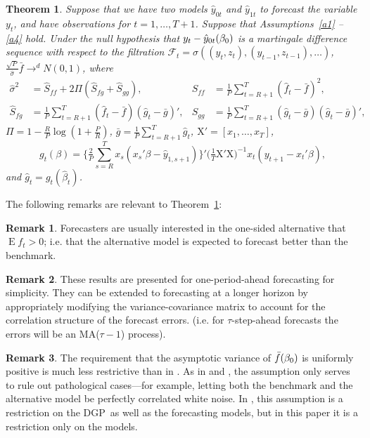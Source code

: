 \documentclass[12pt,fleqn]{article}
\newtheorem{thm}{Theorem}
\theoremstyle{definition}
\newtheorem{rem}{Remark}
\DeclareMathOperator{\E}{E}
\newcommand{\btrue}[1][]{\if#1*\hat\beta_{T+1}\else\beta_0\fi}
\newcommand{\X}{\ensuremath{\mathrm{X}}}
\newcommand{\osum}[1]{\sum_{#1=R+1}^T}
\newcommand{\oavg}[1]{\tfrac{1}{P} \osum{#1}}
\newcommand{\dgp}{DGP}
\newcommand{\ma}{MA}
\begin{document}
\begin{thm}\label{res:1}
  Suppose that we have two models $\hat{y}_{0t}$ and $\hat{y}_{1t}$ to
  forecast the variable $y_t$, and have observations for
  $t=1,\dots,T+1$. Suppose that Assumptions~\ref{a1} -- \ref{a4} hold.
  Under the null hypothesis that $y_t - \hat{y}_{0t}(\btrue)$ is a
  martingale difference sequence with respect to the filtration
  $\mathcal{F}_t = \sigma((y_t, z_{t}), (y_{t-1}, z_{t-1}),\dots)$,
  $\tfrac{\sqrt{P}}{\hat\sigma} \bar f \to^d N(0,1)$, where 
  \begin{align*}
    \hat{\sigma}^2 &= \hat{S}_{ff} + 2 \Pi (\hat{S}_{fg} + \hat{S}_{gg}), &
    \hat{S}_{ff} &= \oavg{t} (\hat f_t - \bar f)^2, \\
    \hat{S}_{fg} &= \oavg{t} (\hat f_t - \bar{f})(\hat g_t - \bar g)', &
    \hat{S}_{gg} &= \oavg{t} (\hat g_t - \bar g)(\hat g_t - \bar g)',
  \end{align*}
  $\Pi = 1 - \tfrac{R}{P} \log(1 + \tfrac{P}{R})$, $\bar{g} = \oavg{t}
  \hat g_t$, $\X' = [x_1,\dots,x_T]$,
  \begin{equation*}
    g_t(\beta) =
    \Big\{\tfrac{2}{P}\sum_{s=R}^T x_s (x_s'\beta - \hat{y}_{1,s+1}) \Big\}'
    \big(\tfrac1T \X'\X \big)^{-1} x_t(y_{t+1} - x_t'\beta),
  \end{equation*}
  and $\hat g_t = g_t(\hat\beta_t)$.
\end{thm}

The following remarks are relevant to Theorem~\ref{res:1}:

\begin{rem}
  Forecasters are usually interested in the one-sided alternative that
  $\E f_t > 0$; i.e. that the alternative model is expected
  to forecast better than the benchmark.
\end{rem}

\begin{rem}
  These results are presented for one-period-ahead forecasting for
  simplicity.  They can be extended to forecasting at a longer horizon
  by appropriately modifying the variance-covariance matrix to account
  for the correlation structure of the forecast errors. (i.e. for
  $\tau$-step-ahead forecasts the errors will be an \ma($\tau-1$) process).
\end{rem}

\begin{rem}
  The requirement that the asymptotic variance of $\bar f(\btrue)$ is
  uniformly positive is much less restrictive than in \cite{Wes:96}.
  As in \cite{GiW:06} and \citet{ClW:06,ClW:07}, the assumption only
  serves to rule out pathological cases---for example, letting both
  the benchmark and the alternative model be perfectly correlated white noise. In
  \citet{Wes:96}, this assumption is a restriction on the \dgp\ as
  well as the forecasting models, but in this paper it is a
  restriction only on the models.
\end{rem}
\end{document}
